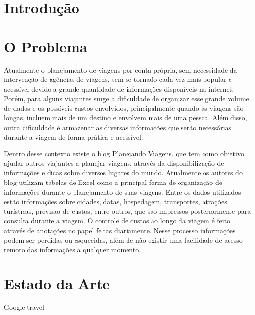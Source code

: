 \documentclass[cic,tc]{iiufrgs}
\begin{document}

\tableofcontents



\chapter{Introdução}


\chapter{O Problema}

Atualmente o planejamento de viagens por conta própria, sem necessidade da intervenção de agências de viagens, tem se tornado cada vez mais popular e acessível devido a grande quantidade de informações disponíveis na internet. Porém, para alguns viajantes surge a dificuldade de organizar esse grande volume de dados e os possíveis custos envolvidos, principalmente quando as viagens são longas, incluem mais de um destino e envolvem mais de uma pessoa. Além disso, outra dificuldade é armazenar as diversas informações que serão necessárias durante a viagem de forma prática e acessível.

Dentro desse contexto existe o blog Planejando Viagens, que tem como objetivo ajudar outros viajantes a planejar viagens, através da disponibilização de informações e dicas sobre diversos lugares do mundo. Atualmente os autores do blog utilizam tabelas de Excel como a principal forma de organização de informações durante o planejamento de suas viagens. Entre os dados utilizados estão informações sobre cidades, datas, hospedagem, transportes, atrações turísticas, previsão de custos, entre outros, que são impressos posteriormente para consulta durante a viagem. O controle de custos ao longo da viagem é feito através de anotações no papel feitas diariamente. Nesse processo informações podem ser perdidas ou esquecidas, além de não existir uma facilidade de acesso remoto das informações a qualquer momento.

\chapter{Estado da Arte}
Google travel
\end{document}

